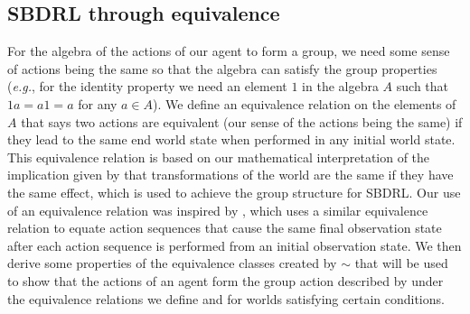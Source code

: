 


\subsection{SBDRL through equivalence}\label{sec:SBDRL through equivalence}


For the algebra of the actions of our agent to form a group, we need some sense of actions being the same so that the algebra can satisfy the group properties (\textit{e.g.}, for the identity property we need an element $1$ in the algebra $A$ such that $1a = a1 = a$ for any $a \in A$).
We define an equivalence relation on the elements of $A$ that says two actions are equivalent (our sense of the actions being the same) if they lead to the same end world state when performed in any initial world state.
This equivalence relation is based on our mathematical interpretation of the implication given by \cite{Higgins2018} that transformations of the world are the same if they have the same effect, which is used to achieve the group structure for SBDRL.
Our use of an equivalence relation was inspired by \cite{caselles2020sensory}, which uses a similar equivalence relation to equate action sequences that cause the same final observation state after each action sequence is performed from an initial observation state.
We then derive some properties of the equivalence classes created by $\sim$ that will be used to show that the actions of an agent form the group action described by \cite{Higgins2018} under the equivalence relations we define and for worlds satisfying certain conditions.


